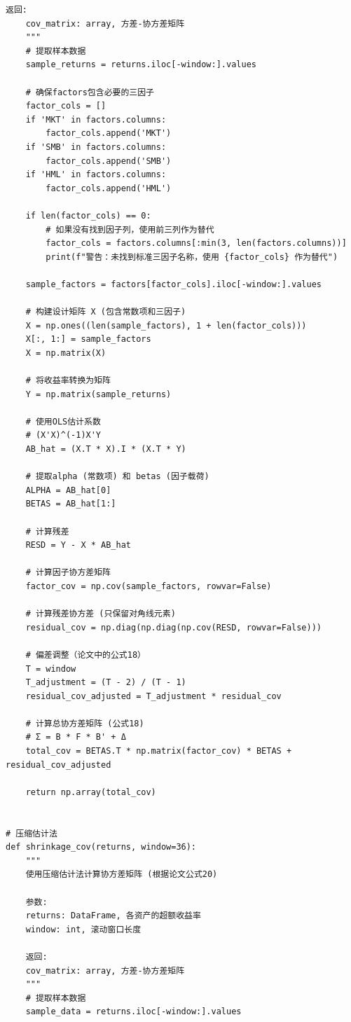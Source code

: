 \documentclass[12pt, a4paper]{article}
\begin{document}
\begin{lstlisting}[basicstyle=\small\ttfamily, breaklines=true, columns=fullflexible]
    返回:
    cov_matrix: array, 方差-协方差矩阵
    """
    # 提取样本数据
    sample_returns = returns.iloc[-window:].values
    
    # 确保factors包含必要的三因子
    factor_cols = []
    if 'MKT' in factors.columns:
        factor_cols.append('MKT')
    if 'SMB' in factors.columns:
        factor_cols.append('SMB')
    if 'HML' in factors.columns:
        factor_cols.append('HML')
    
    if len(factor_cols) == 0:
        # 如果没有找到因子列，使用前三列作为替代
        factor_cols = factors.columns[:min(3, len(factors.columns))]
        print(f"警告：未找到标准三因子名称，使用 {factor_cols} 作为替代")
    
    sample_factors = factors[factor_cols].iloc[-window:].values
    
    # 构建设计矩阵 X (包含常数项和三因子)
    X = np.ones((len(sample_factors), 1 + len(factor_cols)))
    X[:, 1:] = sample_factors
    X = np.matrix(X)
    
    # 将收益率转换为矩阵
    Y = np.matrix(sample_returns)
    
    # 使用OLS估计系数
    # (X'X)^(-1)X'Y
    AB_hat = (X.T * X).I * (X.T * Y)
    
    # 提取alpha (常数项) 和 betas (因子载荷)
    ALPHA = AB_hat[0]
    BETAS = AB_hat[1:]
    
    # 计算残差
    RESD = Y - X * AB_hat
    
    # 计算因子协方差矩阵
    factor_cov = np.cov(sample_factors, rowvar=False)
    
    # 计算残差协方差 (只保留对角线元素)
    residual_cov = np.diag(np.diag(np.cov(RESD, rowvar=False)))
    
    # 偏差调整（论文中的公式18）
    T = window
    T_adjustment = (T - 2) / (T - 1)
    residual_cov_adjusted = T_adjustment * residual_cov
    
    # 计算总协方差矩阵 (公式18)
    # Σ = B * F * B' + Δ
    total_cov = BETAS.T * np.matrix(factor_cov) * BETAS + residual_cov_adjusted
    
    return np.array(total_cov)


# 压缩估计法
def shrinkage_cov(returns, window=36):
    """
    使用压缩估计法计算协方差矩阵 (根据论文公式20)
    
    参数:
    returns: DataFrame, 各资产的超额收益率
    window: int, 滚动窗口长度
    
    返回:
    cov_matrix: array, 方差-协方差矩阵
    """
    # 提取样本数据
    sample_data = returns.iloc[-window:].values
    

\end{lstlisting}
\end{document}
